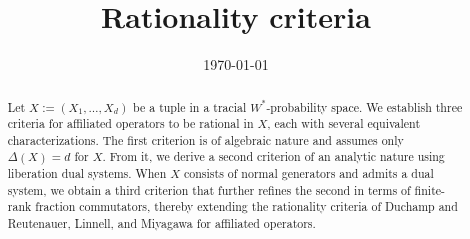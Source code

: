 \documentclass[11pt,reqno]{amsart}
\title[Rationality criteria]{Rationality criteria}
\date{\today}
\theoremstyle{definition}
\theoremstyle{remark}
\begin{document}
\begin{abstract}
Let $X:=(X_1,\ldots,X_d)$ be a tuple in a tracial $W^*$-probability space.
We establish three criteria for affiliated operators to be rational in $X$, each with several equivalent characterizations.
The first criterion is of algebraic nature and assumes only $\Delta(X)=d$ for $X$.
From it, we derive a second criterion of an analytic nature using liberation dual systems.
When $X$ consists of normal generators and admits a dual system, we obtain a third criterion that further refines the second in terms of finite-rank fraction commutators, thereby extending the rationality criteria of Duchamp and Reutenauer, Linnell, and Miyagawa for affiliated operators.
\end{abstract}
\maketitle









\end{document}
